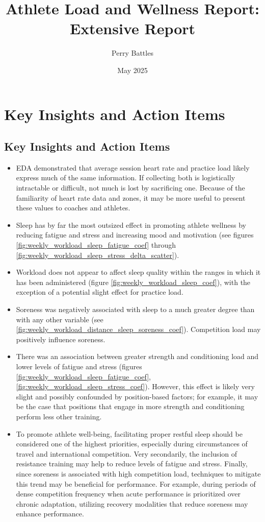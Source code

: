 \documentclass{article}
\title{Athlete Load and Wellness Report: Extensive Report}
\author{Perry Battles}
\date{May 2025}
\begin{document}
	\maketitle

	\section{Key Insights and Action Items}

		\subsection{Key Insights and Action Items}

			\begin{itemize}
				\item EDA demonstrated that average session heart rate and
				practice load likely express much of the same information.
				If collecting both is logistically intractable or difficult,
				not much is lost by sacrificing one. Because of the familiarity
				of heart rate data and zones, it may be more useful to present
				these values to coaches and athletes.
				\item Sleep has by far the most outsized effect in promoting
				athlete wellness by reducing fatigue and stress and increasing
				mood and motivation (see figures
				\ref{fig:weekly_workload_sleep_fatigue_coef} through
				\ref{fig:weekly_workload_sleep_stress_delta_scatter}).
				\item Workload does not appear to affect sleep quality within
				the ranges in which it has been administered (figure
				\ref{fig:weekly_workload_sleep_coef}), with the exception of a potential
				slight effect for practice load.
				\item Soreness was negatively associated with sleep to a much
				greater degree than with any other variable (see
				\ref{fig:weekly_workload_distance_sleep_soreness_coef}).
				Competition load may positively influence soreness.
				\item There was an association between greater
				strength and conditioning load and lower levels of fatigue
				and stress (figures \ref{fig:weekly_workload_sleep_fatigue_coef},
				\ref{fig:weekly_workload_sleep_stress_coef}).
				However, this effect is likely very slight and possibly
				confounded by position-based factors; for example, it may be
				the case that positions that engage in more strength and
				conditioning perform less other training.
				\item To promote athlete well-being, facilitating proper
				restful sleep should be considered one of the highest priorities,
				especially during circumstances of travel and international
				competition. Very
				secondarily, the inclusion of resistance training may help to
				reduce levels of fatigue and stress. Finally, since soreness is
				associated with high competition load, techniques to mitigate
				this trend may be beneficial for performance. For example,
				during periods of dense competition frequency when acute
				performance is prioritized over chronic adaptation, utilizing
				recovery modalities that reduce soreness may enhance performance.
			\end{itemize}
\end{document}
